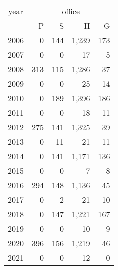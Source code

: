 \footnotesize\begin{tabular}[t]{lrrrr}
\toprule
\multicolumn{1}{c}{year} & \multicolumn{4}{c}{office} \\
\cmidrule(l{3pt}r{3pt}){1-1} \cmidrule(l{3pt}r{3pt}){2-5}
  & P & S & H & G\\
\midrule
2006 & 0 & 144 & 1,239 & 173\\
2007 & 0 & 0 & 17 & 5\\
2008 & 313 & 115 & 1,286 & 37\\
2009 & 0 & 0 & 25 & 14\\
2010 & 0 & 189 & 1,396 & 186\\
2011 & 0 & 0 & 18 & 11\\
2012 & 275 & 141 & 1,325 & 39\\
2013 & 0 & 11 & 21 & 11\\
2014 & 0 & 141 & 1,171 & 136\\
2015 & 0 & 0 & 7 & 8\\
2016 & 294 & 148 & 1,136 & 45\\
2017 & 0 & 2 & 21 & 10\\
2018 & 0 & 147 & 1,221 & 167\\
2019 & 0 & 0 & 10 & 9\\
2020 & 396 & 156 & 1,219 & 46\\
2021 & 0 & 0 & 12 & 0\\
\bottomrule
\end{tabular}
